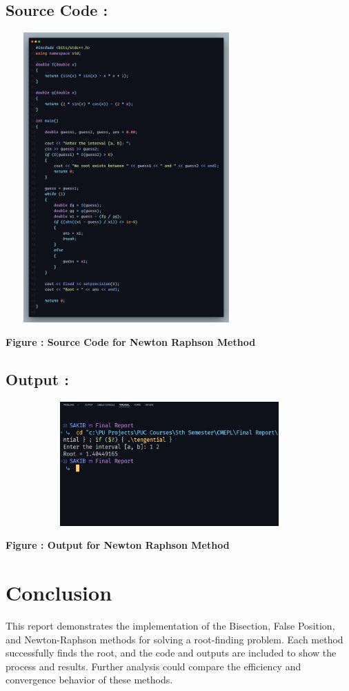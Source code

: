 \documentclass{scrreprt}
\begin{document}
\subsection*{Source Code : }
\begin{center}
    {\includegraphics[width=350px, height=420px]{newton_code.png}}
    \parbox{0.8\textwidth}{ 
        \centering
        \textbf{Figure : Source Code for Newton Raphson Method}
    }
\end{center}
\subsection*{Output : }
\begin{center}
    {\includegraphics[width=475px, height=180px]{newton_output.png}}
    \parbox{0.8\textwidth}{ 
        \centering
        \textbf{Figure : Output for Newton Raphson Method}
    }
\end{center}


\section*{Conclusion}
This report demonstrates the implementation of the Bisection, False Position, and Newton-Raphson methods for solving a root-finding problem. Each method successfully finds the root, and the code and outputs are included to show the process and results. Further analysis could compare the efficiency and convergence behavior of these methods.
\end{document}
